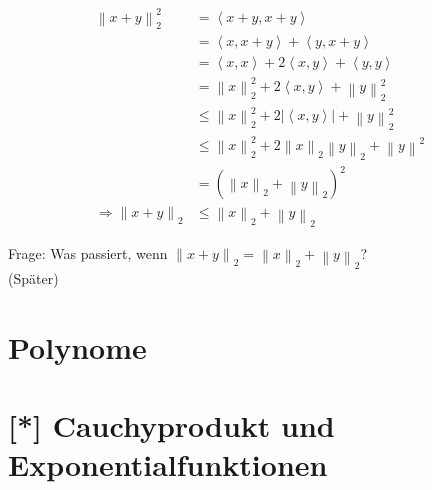 \documentclass[11pt, twoside, a4paper]{article}
\theoremstyle{plain}
\newcommand{\pair}[1]{\left(#1\right)}
\newcommand{\abs}[1]{\left\lvert#1\right\rvert}
\newcommand{\norm}[1]{\left\lVert#1\right\rVert}
\newcommand{\sprod}[1]{\left<#1\right>}
\newcommand{\impl}[0]{\Rightarrow{}}
\begin{document}
    \begin{align*}
        \norm{x+y}_2^2 &= \sprod{x+y,x+y}\\
        &= \sprod{x,x+y}+ \sprod{y,x+y}\\
        &= \sprod{x,x} + 2 \sprod{x,y} + \sprod{y,y}\\
        &= \norm{x}_2^2 + 2\sprod{x,y} + \norm{y}_2^2\\
        &\leq \norm{x}_2^2 + 2\abs{\sprod{x,y}} + \norm{y}_2^2\\
        &\leq \norm{x}_2^2 + 2\norm{x}_2 \norm{y}_2 + \norm{y}^2\\
        &= \pair{\norm{x}_2 + \norm{y}_2}^2\\
        \impl \norm{x+y}_2 &\leq \norm{x}_2 + \norm{y}_2\tag{Dreiecksungleichung für Eukl. Norm}
    \end{align*}

    \noindent Frage: Was passiert, wenn $\norm{x+y}_2 = \norm{x}_2 + \norm{y}_2$?\\
    (Später)

    \newpage


    \section{Polynome}
    


    \section{[*] Cauchyprodukt und Exponentialfunktionen}
    \thispagestyle{pagenumberonly}
\end{document}
